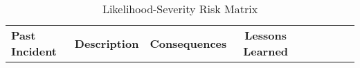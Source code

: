 \begin{landscape}
\begin{small}
\begin{longtable}{p{4cm}p{11.5cm}ccccccc}
\caption{Likelihood-Severity Risk Matrix}
\label{tab:risk-matrix}
\setlist{nosep,leftmargin=1em}\\
\toprule
                                                                                                                       \textbf{Past Incident}  & \textbf{Description}                                                                                                                                                                     & \textbf{Consequences}                                                                                                                                                                                                     &  \textbf{Lessons Learned}                                      \midrule

\end{longtable}
\end{small}
\end{landscape}
